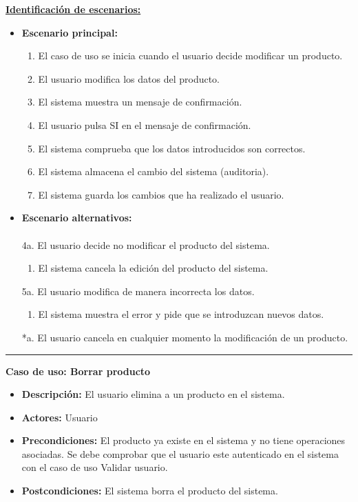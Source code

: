 \underline{\textbf{Identificación de escenarios:}}
\begin{itemize}\renewcommand{\labelitemi}{$\circ$}
 \item \textbf{Escenario principal:}
         \begin{enumerate}
          \item El caso de uso se inicia cuando el usuario decide modificar un producto.
          \item El usuario modifica los datos del producto.
	  \item El sistema muestra un mensaje de confirmación.
          \item El usuario pulsa SI en el mensaje de confirmación.
          \item El sistema comprueba que los datos introducidos son correctos.
 	  \item El sistema almacena el cambio del sistema (auditoria).
          \item El sistema guarda los cambios que ha realizado el usuario.
         \end{enumerate}
  \item \textbf{Escenario alternativos:}\\\\
	4a. El usuario decide no modificar el producto del sistema.
	      \begin{enumerate}
	       \item El sistema cancela la edición del producto del sistema.
	      \end{enumerate}
           5a. El usuario modifica de manera incorrecta los datos.
		\begin{enumerate}
		 \item El sistema muestra el error y pide que se introduzcan nuevos datos.
		\end{enumerate}
          *a. El usuario cancela en cualquier momento la modificación de un producto.
\end{itemize}
\smallskip
\hrule height 1pt
\smallskip
\textbf{Caso de uso: Borrar producto}
\begin{itemize}\renewcommand{\labelitemi}{$\cdot$}
 \item \textbf{Descripción:} El usuario elimina a un producto en el sistema.
  \item \textbf{Actores:} Usuario
  \item \textbf{Precondiciones:} El producto ya existe en el sistema y no tiene operaciones asociadas. Se debe comprobar que el usuario este autenticado en el sistema con el caso de uso Validar usuario.
  \item \textbf{Postcondiciones:} El sistema borra el producto del sistema.
\end{itemize}
